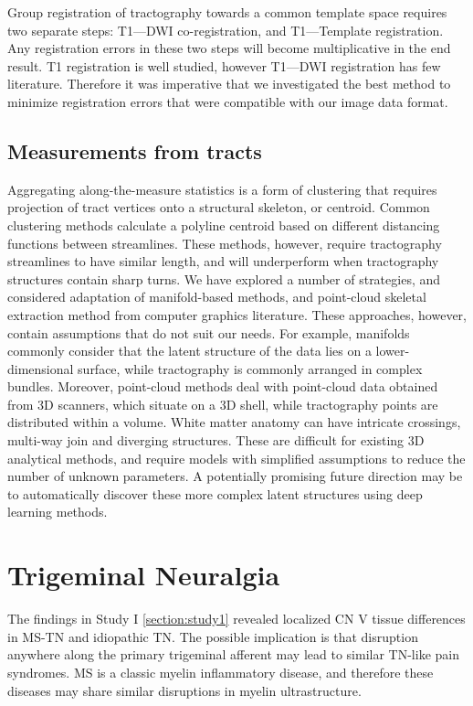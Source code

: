 Group registration of tractography towards a common template space requires two separate steps: T1---DWI co-registration, and T1---Template registration. Any registration errors in these two steps will become multiplicative in the end result. T1 registration is well studied, however T1---DWI registration has few literature. Therefore it was imperative that we investigated the best method to minimize registration errors that were compatible with our image data format.

\subsection{Measurements from tracts}
Aggregating along-the-measure statistics is a form of clustering that requires projection of tract vertices onto a structural skeleton, or centroid. Common clustering methods calculate a polyline centroid based on different distancing functions between streamlines. These methods,  however, require tractography streamlines to have similar length, and will underperform when tractography structures contain sharp turns. We have explored a number of strategies, and considered adaptation of manifold-based methods, and point-cloud skeletal extraction method from computer graphics literature. These approaches, however, contain assumptions that do not suit our needs. For example, manifolds commonly consider that the latent structure of the data lies on a lower-dimensional surface, while tractography is commonly arranged in complex bundles. Moreover, point-cloud methods deal with point-cloud data obtained from 3D scanners, which situate on a 3D shell, while tractography points are distributed within a volume. White matter anatomy can have intricate crossings, multi-way join and diverging structures. These are difficult for existing 3D analytical methods, and require models with simplified assumptions to reduce the number of unknown parameters. A potentially promising future direction may be to automatically discover these more complex latent structures using deep learning methods. 

\section{Trigeminal Neuralgia}

The findings in Study I \ref{section:study1} revealed localized CN V tissue differences in MS-TN and idiopathic TN. The possible implication is that disruption anywhere along the primary trigeminal afferent may lead to similar TN-like pain syndromes. MS is a classic myelin inflammatory disease, and therefore these diseases may share similar disruptions in myelin ultrastructure.

